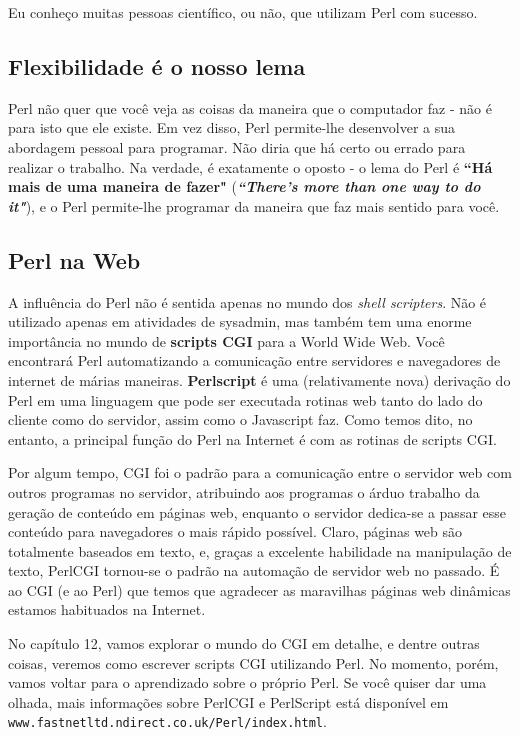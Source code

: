 \documentclass[a4paper,12pt,twoside]{book}
\begin{document}
\noindent Eu conheço muitas pessoas científico, ou não, que utilizam Perl com sucesso.

\subsection{Flexibilidade é o nosso lema}

\noindent Perl não quer que você veja as coisas da maneira que o computador faz - não 
é para isto que ele existe. Em vez disso, Perl permite-lhe desenvolver a sua 
abordagem pessoal para programar. Não diria que há certo ou errado para realizar 
o trabalho. Na verdade, é exatamente o oposto - o lema do Perl é \textbf{``Há mais 
de uma maneira de fazer"} (\textit{\textbf{``There's more than one way to do it"}}), e o Perl 
permite-lhe programar da maneira que faz mais sentido para você.

\subsection{Perl na Web}

\noindent A influência do Perl não é sentida apenas no mundo dos \textit{shell scripters}. 
Não é utilizado apenas em atividades de sysadmin, mas também tem uma enorme importância no 
mundo de \textbf{scripts CGI} para a World Wide Web. Você encontrará Perl automatizando 
a comunicação entre servidores e navegadores de internet de márias maneiras. 
\textbf{Perlscript} é uma (relativamente nova) derivação do Perl em uma linguagem que pode 
ser executada rotinas web tanto do lado do cliente como do servidor, assim como o Javascript 
faz. Como temos dito, no entanto, a principal função do Perl na Internet 
é com as rotinas de scripts CGI.\medskip

\noindent Por algum tempo, CGI foi o padrão para a comunicação entre o servidor web com outros 
programas no servidor, atribuindo aos programas o árduo trabalho da geração de conteúdo 
em páginas web, enquanto o servidor dedica-se a passar esse conteúdo para navegadores o 
mais rápido possível. Claro, páginas web são totalmente baseados em texto, e, graças a 
excelente habilidade na manipulação de texto, PerlCGI tornou-se o padrão na automação de 
servidor web no passado. É ao CGI (e ao Perl) que temos que agradecer as maravilhas páginas 
web dinâmicas estamos habituados na Internet.\medskip

\noindent No capítulo 12, vamos explorar o mundo do CGI em detalhe, e dentre outras coisas, 
veremos como escrever scripts CGI utilizando Perl. No momento, porém, vamos voltar para o 
aprendizado sobre o próprio Perl. Se você quiser dar uma olhada, mais informações sobre PerlCGI 
e PerlScript está disponível em \texttt{www.fastnetltd.ndirect.co.uk/Perl/index.html}.
\end{document}

